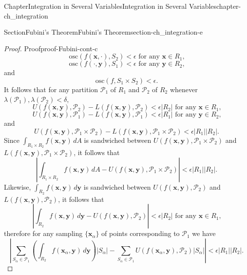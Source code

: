 \documentclass[oneside,10pt,]{book}
\numberwithin{equation}{section}
\newcommand{\bx}{\mathbf{x}}
\newcommand{\by}{\mathbf{y}}
\newcommand{\cP}{\mathcal{P}}
\newcommand{\osc}{\text{osc}}
\newcommand{\lt}{<}
\begin{document}
\begin{chapterptx}{Chapter}{Integration in Several Variables}{}{Integration in Several Variables}{}{}{chapter-ch_integration}
\begin{sectionptx}{Section}{Fubini's Theorem}{}{Fubini's Theorem}{}{}{section-ch_integration-e}
\begin{proof}{Proof}{}{proof-Fubini-cont-c}
\begin{equation*}
\osc (f(\bx, \cdot), S_{2}) \lt \epsilon \text{ for any $\bx \in R_{1}$,}
\end{equation*}
%
\begin{equation*}
\osc (f(\cdot, \by), S_{1}) \lt \epsilon \text{ for any $\by \in R_{2}$,}
\end{equation*}
and%
\begin{equation*}
\osc (f, S_{1}\times S_{2}) \lt \epsilon.
\end{equation*}
It follows that for any partition \(\cP_{1}\) of \(R_{1}\) and \(\cP_{2}\) of \(R_{2}\) whenever \(\lambda (\cP_{1}), \lambda (\cP_{2}) \lt \delta\),%
\begin{equation*}
U(f(\bx, \by), \cP_{2})-L(f(\bx, \by), \cP_{2}) \lt \epsilon |R_{2}| \text{ for any $\bx \in R_{1}$,}
\end{equation*}
%
\begin{equation*}
U(f(\bx, \by), \cP_{1})-L(f(\bx, \by), \cP_{1}) \lt \epsilon |R_{1}| \text{ for any $\by \in R_{2}$,}
\end{equation*}
and%
\begin{equation*}
U(f(\bx, \by), \cP_{1}\times \cP_{2})-L(f(\bx, \by), \cP_{1}\times \cP_{2}) \lt \epsilon |R_{1}| |R_{2}|.
\end{equation*}
Since \(\int_{R_{1}\times R_{2}} f(\bx, \by)\, dA\) is sandwiched between \(U(f(\bx, \by), \cP_{1}\times \cP_{2})\) and \(L(f(\bx, \by), \cP_{1}\times \cP_{2})\), it follows that%
\begin{equation*}
\left\vert \int_{R_{1}\times R_{2}} f(\bx, \by)\, dA - U(f(\bx, \by), \cP_{1}\times \cP_{2}) \right \vert 
\lt \epsilon |R_{1}| |R_{2}|.
\end{equation*}
Likewise, \(\int_{R_{2}} f(\bx, \by)\, d\by\) is sandwiched between \(U(f(\bx, \by), \cP_{2})\) and \(L(f(\bx, \by), \cP_{2})\), it follows that%
\begin{equation*}
\left\vert \int_{R_{2}} f(\bx, \by)\, d\by - U(f(\bx, \by), \cP_{2}) \right \vert \lt \epsilon |R_{2}|
\text{ for any $\bx \in R_{1}$,}
\end{equation*}
therefore for any sampling \(\{\bx_{\alpha}\}\) of points corresponding to \(\cP_{1}\) we have%
\begin{equation*}
\left\vert \sum_{S_{\alpha}\in \cP_1} \left(\int_{R_{2}} f(\bx_{\alpha}, \by)\, d\by \right) |S_{\alpha}|- 
\sum_{S_{\alpha}\in \cP_1} U(f(\bx_{\alpha}, \by), \cP_{2}) |S_{\alpha}| \right \vert \lt\epsilon |R_{1}| |R_{2}|.
\end{equation*}

\end{proof}
\end{sectionptx}
\end{chapterptx}
\end{document}
